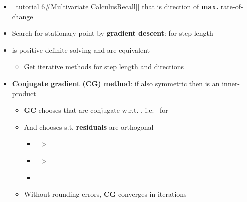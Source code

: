 \begin{itemize}

\item
  {[}{[}tutorial 6\#Multivariate Calculus\textbar Recall{]}{]} that
   is direction of \textbf{max.}
  rate-of-change 
\item
  Search for stationary point by \textbf{gradient descent}:
  for step length \iMbox{\alpha}
\item
   is positive-definite solving
   and
  are equivalent

  \begin{itemize}
  
  \item
    Get iterative methods
    for step length  and directions
  \end{itemize}
\item
  \textbf{Conjugate gradient (CG) method}: if
   also symmetric then
  is an inner-product

  \begin{itemize}
  
  \item
    \textbf{GC} chooses  that are conjugate
    w.r.t. ,
    i.e.~
    for 
  \item
    And chooses  s.t. \textbf{residuals}
    are orthogonal

    \begin{itemize}
    
    \item
       =\textgreater{}
    \item
       =\textgreater{}
    \item
    \end{itemize}
  \item
    Without rounding errors, \textbf{CG} converges in 
    iterations


\end{itemize}
\end{itemize}
